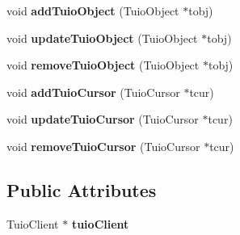 \begin{DoxyCompactItemize}
\item 
\hypertarget{classpho_1_1Engine_a226682d9f6f087a5808e6eb21b330b01}{void {\bfseries add\-Tuio\-Object} (Tuio\-Object $\ast$tobj)}\label{classpho_1_1Engine_a226682d9f6f087a5808e6eb21b330b01}

\item 
\hypertarget{classpho_1_1Engine_ae08af0370a3277418f1cbad6f293995f}{void {\bfseries update\-Tuio\-Object} (Tuio\-Object $\ast$tobj)}\label{classpho_1_1Engine_ae08af0370a3277418f1cbad6f293995f}

\item 
\hypertarget{classpho_1_1Engine_ab64f95319532116ab75afd4140ab0af8}{void {\bfseries remove\-Tuio\-Object} (Tuio\-Object $\ast$tobj)}\label{classpho_1_1Engine_ab64f95319532116ab75afd4140ab0af8}

\item 
\hypertarget{classpho_1_1Engine_a0e50e8111b9a2da5a4f46bd716d049b2}{void {\bfseries add\-Tuio\-Cursor} (Tuio\-Cursor $\ast$tcur)}\label{classpho_1_1Engine_a0e50e8111b9a2da5a4f46bd716d049b2}

\item 
\hypertarget{classpho_1_1Engine_ad3c836022d6b6ddc37cb1c0e5d6eb376}{void {\bfseries update\-Tuio\-Cursor} (Tuio\-Cursor $\ast$tcur)}\label{classpho_1_1Engine_ad3c836022d6b6ddc37cb1c0e5d6eb376}

\item 
\hypertarget{classpho_1_1Engine_a7135ab4aa02dd55685c144d1291cd7bf}{void {\bfseries remove\-Tuio\-Cursor} (Tuio\-Cursor $\ast$tcur)}\label{classpho_1_1Engine_a7135ab4aa02dd55685c144d1291cd7bf}

\end{DoxyCompactItemize}
\subsection*{Public Attributes}
\begin{DoxyCompactItemize}
\item 
\hypertarget{classpho_1_1Engine_a3cc0d353df3842afa2aca086c4237b97}{Tuio\-Client $\ast$ {\bfseries tuio\-Client}}\label{classpho_1_1Engine_a3cc0d353df3842afa2aca086c4237b97}

\end{DoxyCompactItemize}
